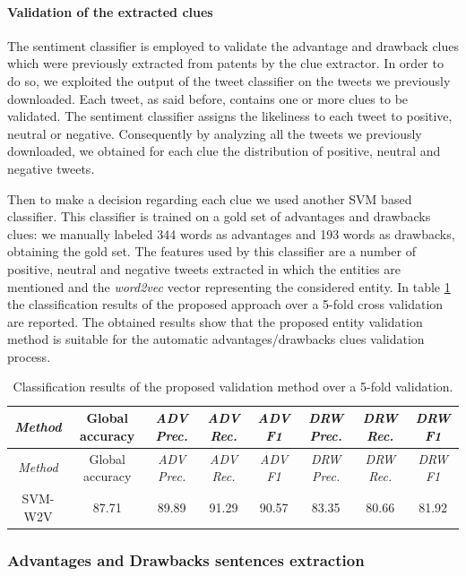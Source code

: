 \documentclass[]{book}
\let\oldparagraph\paragraph
\renewcommand{\paragraph}[1]{\oldparagraph{#1}\mbox{}}
\begin{document}
\paragraph{Validation of the extracted
clues}\label{validation-of-the-extracted-clues}

The sentiment classifier is employed to validate the advantage and
drawback clues which were previously extracted from patents by the clue
extractor. In order to do so, we exploited the output of the tweet
classifier on the tweets we previously downloaded. Each tweet, as said
before, contains one or more clues to be validated. The sentiment
classifier assigns the likeliness to each tweet to positive, neutral or
negative. Consequently by analyzing all the tweets we previously
downloaded, we obtained for each clue the distribution of positive,
neutral and negative tweets.

Then to make a decision regarding each clue we used another SVM based
classifier. This classifier is trained on a gold set of advantages and
drawbacks clues: we manually labeled 344 words as advantages and 193
words as drawbacks, obtaining the gold set. The features used by this
classifier are a number of positive, neutral and negative tweets
extracted in which the entities are mentioned and the \emph{word2vec}
vector representing the considered entity. In table
\ref{tab:sentiment-validation} the classification results of the
proposed approach over a 5-fold cross validation are reported. The
obtained results show that the proposed entity validation method is
suitable for the automatic advantages/drawbacks clues validation
process.

\begin{longtable}[]{@{}cccccccc@{}}
\caption{\label{tab:sentiment-validation} Classification results of the
proposed validation method over a 5-fold validation.}\tabularnewline
\toprule
\emph{Method} & Global accuracy & \emph{ADV Prec.} & \emph{ADV Rec.} &
\emph{ADV F1} & \emph{DRW Prec.} & \emph{DRW Rec.} & \emph{DRW
F1}\tabularnewline
\midrule
\endfirsthead
\toprule
\emph{Method} & Global accuracy & \emph{ADV Prec.} & \emph{ADV Rec.} &
\emph{ADV F1} & \emph{DRW Prec.} & \emph{DRW Rec.} & \emph{DRW
F1}\tabularnewline
\midrule
\endhead
SVM-W2V & 87.71 & 89.89 & 91.29 & 90.57 & 83.35 & 80.66 &
81.92\tabularnewline
\bottomrule
\end{longtable}

\subsubsection{Advantages and Drawbacks sentences
extraction}\label{advantages-and-drawbacks-sentences-extraction}
\end{document}
